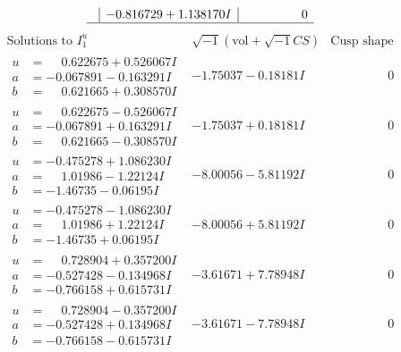 \documentclass[1p]{elsarticle_modified}
\theoremstyle{definition}
\newcommand{\I}{\sqrt{-1}}
\begin{document}
$$\begin{array}{c|c|c}
 & -0.816729 + 1.138170 I & \phantom{-0.000000 } 0\\
 \hline 
 \end{array}$$\newpage$$\begin{array}{c|c|c}  
\text{Solutions to }I^u_{1}& \I (\text{vol} + \sqrt{-1}CS) & \text{Cusp shape}\\
 \hline 
\begin{aligned}
u &= \phantom{-}0.622675 + 0.526067 I \\
a &= -0.067891 - 0.163291 I \\
b &= \phantom{-}0.621665 + 0.308570 I\end{aligned}
 & -1.75037 - 0.18181 I & \phantom{-0.000000 } 0 \\ \hline\begin{aligned}
u &= \phantom{-}0.622675 - 0.526067 I \\
a &= -0.067891 + 0.163291 I \\
b &= \phantom{-}0.621665 - 0.308570 I\end{aligned}
 & -1.75037 + 0.18181 I & \phantom{-0.000000 } 0 \\ \hline\begin{aligned}
u &= -0.475278 + 1.086230 I \\
a &= \phantom{-}1.01986 - 1.22124 I \\
b &= -1.46735 - 0.06195 I\end{aligned}
 & -8.00056 - 5.81192 I & \phantom{-0.000000 } 0 \\ \hline\begin{aligned}
u &= -0.475278 - 1.086230 I \\
a &= \phantom{-}1.01986 + 1.22124 I \\
b &= -1.46735 + 0.06195 I\end{aligned}
 & -8.00056 + 5.81192 I & \phantom{-0.000000 } 0 \\ \hline\begin{aligned}
u &= \phantom{-}0.728904 + 0.357200 I \\
a &= -0.527428 - 0.134968 I \\
b &= -0.766158 + 0.615731 I\end{aligned}
 & -3.61671 + 7.78948 I & \phantom{-0.000000 } 0 \\ \hline\begin{aligned}
u &= \phantom{-}0.728904 - 0.357200 I \\
a &= -0.527428 + 0.134968 I \\
b &= -0.766158 - 0.615731 I\end{aligned}
 & -3.61671 - 7.78948 I & \phantom{-0.000000 } 0 \\ \hline\begin{aligned}

\end{aligned}
\end{array}$$
\end{document}
